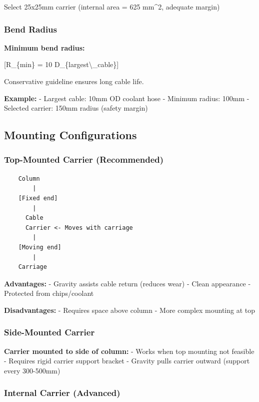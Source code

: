 \documentclass[
]{article}
\begin{document}
Select 25x25mm carrier (internal area = 625 mm\^{}2, adequate margin)

\subsubsection{Bend Radius}\label{bend-radius}

\textbf{Minimum bend radius:}

{[}R\_\{min\} = 10 \times D\_\{largest\textbackslash\_cable\}{]}

Conservative guideline ensures long cable life.

\textbf{Example:} - Largest cable: 10mm OD coolant hose - Minimum
radius: 100mm - Selected carrier: 150mm radius (safety margin)

\subsection{Mounting Configurations}\label{mounting-configurations}

\subsubsection{Top-Mounted Carrier
(Recommended)}\label{top-mounted-carrier-recommended}

\begin{verbatim}
    Column
        |
    [Fixed end]
        |
      Cable
      Carrier <- Moves with carriage
        |
    [Moving end]
        |
    Carriage
\end{verbatim}

\textbf{Advantages:} - Gravity assists cable return (reduces wear) -
Clean appearance - Protected from chips/coolant

\textbf{Disadvantages:} - Requires space above column - More complex
mounting at top

\subsubsection{Side-Mounted Carrier}\label{side-mounted-carrier}

\textbf{Carrier mounted to side of column:} - Works when top mounting
not feasible - Requires rigid carrier support bracket - Gravity pulls
carrier outward (support every 300-500mm)

\subsubsection{Internal Carrier
(Advanced)}\label{internal-carrier-advanced}
\end{document}
